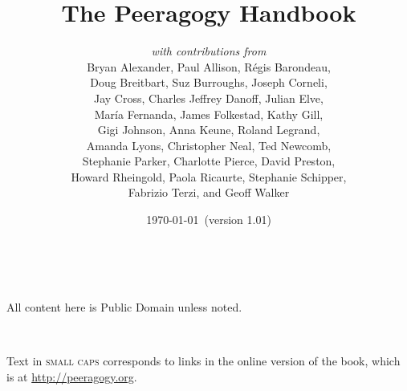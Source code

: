 \documentclass[ebook, 12pt, twoside]{memoir}
\let\sc\scshape
\begin{document}
\sloppy 
{}
\title{The Peeragogy Handbook\\[1in]}
\author{
\emph{with contributions from} \\
{\small Bryan Alexander, Paul Allison, R\'egis Barondeau,} \\
{\small Doug Breitbart, Suz Burroughs,  Joseph Corneli, }\\ 
{\small Jay Cross, Charles Jeffrey Danoff, Julian Elve,}\\
{\small Mar\'ia Fernanda, James Folkestad, Kathy Gill, }\\
{\small Gigi Johnson, Anna Keune, Roland Legrand,} \\
{\small Amanda Lyons, Christopher Neal, Ted Newcomb,} \\
{\small Stephanie Parker, Charlotte Pierce, David Preston,} \\
{\small Howard Rheingold, Paola Ricaurte, Stephanie Schipper,} \\
{\small Fabrizio Terzi, and Geoff Walker}
}
\date{\today\ (version 1.01)}
\maketitle
\thispagestyle{empty}

\quad \\[3in] 
\begin{center}
{\large All content here is Public Domain unless noted.}
\end{center}
\quad \\
\begin{center}
{\large Text in {\sc small caps} corresponds to links in the online
  version of the book, which is at \url{http://peeragogy.org}.}
\end{center}
\thispagestyle{empty}
\end{document}
